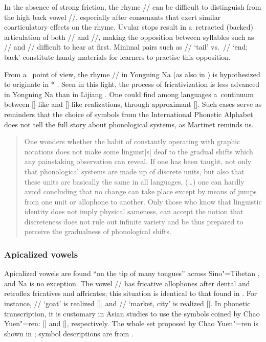 	In the absence of strong friction, the rhyme // can be difficult to distinguish from the high
	back vowel //, especially after consonants that exert similar {coarticulatory} effects on the
	rhyme. Uvular stops result in a~retracted (backed) articulation of both // and //,
	making the opposition between syllables such as // and // difficult to hear at
	first. Minimal pairs such as // ‘tail’ vs.\ // ‘end; back’ constitute handy materials for learners to practise this opposition.
	
	From a~ point of view, the rhyme // in Yongning Na (as also in ) is hypothesized to originate in * \citep{jacquesetal2011}. Seen in this light, the process of fricativization is less advanced in Yongning Na than in Lijiang . One could find among  languages a~continuum between []-like and []-like realizations, through approximant []. Such cases serve as reminders that the choice of symbols from the International Phonetic Alphabet does not tell the full story about phonological systems, as Martinet reminds us.
	
	\begin{quotation}
		One wonders whether the habit of constantly operating with graphic notations does not make some linguist[s] deaf to the gradual shifts which any painstaking observation can reveal. If one has been taught, not only that phonological systems are made up of discrete units, but also that these units are basically the same in all languages, ({\dots}) one can hardly avoid concluding that no change can take place except by means of jumps from one unit or allophone to another. Only those who know that linguistic identity does not imply physical sameness, can accept the notion that discreteness does not rule out infinite variety and be thus prepared to perceive the gradualness of phonological shifts. \citep[25]{martinet1988}
	\end{quotation}
	

	\subsubsection{Apicalized vowels}
	\label{sec:apicalizedvowels}
	
{\largerpage}

	Apicalized vowels are found “on the tip of many tongues” across Sino"=Tibetan \citep{baron1974}, and Na is no exception. The vowel  // has fricative allophones after dental and retroflex fricatives and affricates; this situation is identical to that found in . For instance,  // ‘goat’
	is realized  [], and  // ‘market, city’ is realized  []. In phonetic transcription, it is customary in Asian studies to use the symbols coined by Chao Yuen"=ren:
	[] and [], respectively. The whole set proposed by Chao Yuen"=ren is shown in ; symbol descriptions are from \citet[80, 89-90]{pullumetal1986}.
	
